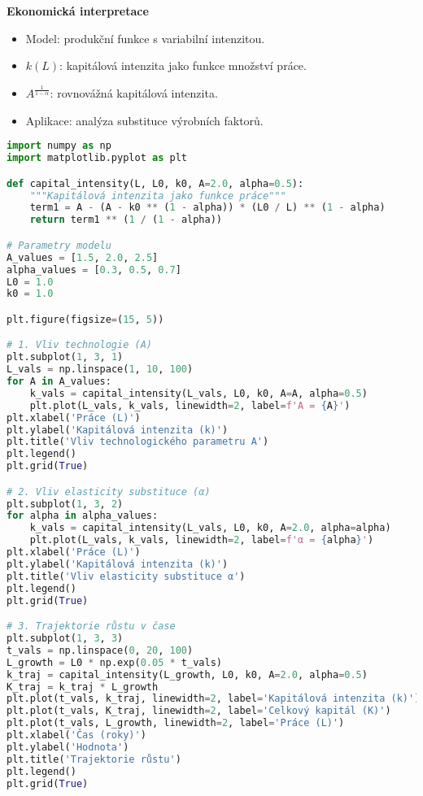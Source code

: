 \begin{example}
\noindent\textbf{Ekonomická interpretace}
\begin{itemize}
\item Model: produkční funkce s variabilní intenzitou.
\item $k(L)$: kapitálová intenzita jako funkce množství práce.
\item $A^{\tfrac{1}{1-\alpha}}$: rovnovážná kapitálová intenzita.
\item Aplikace: analýza substituce výrobních faktorů.
\end{itemize}

\begin{lstlisting}[language=Python, caption={Implementace modelu substituce v~Pythonu}]
import numpy as np
import matplotlib.pyplot as plt

def capital_intensity(L, L0, k0, A=2.0, alpha=0.5):
    """Kapitálová intenzita jako funkce práce"""
    term1 = A - (A - k0 ** (1 - alpha)) * (L0 / L) ** (1 - alpha)
    return term1 ** (1 / (1 - alpha))

# Parametry modelu
A_values = [1.5, 2.0, 2.5]
alpha_values = [0.3, 0.5, 0.7]
L0 = 1.0
k0 = 1.0

plt.figure(figsize=(15, 5))

# 1. Vliv technologie (A)
plt.subplot(1, 3, 1)
L_vals = np.linspace(1, 10, 100)
for A in A_values:
    k_vals = capital_intensity(L_vals, L0, k0, A=A, alpha=0.5)
    plt.plot(L_vals, k_vals, linewidth=2, label=f'A = {A}')
plt.xlabel('Práce (L)')
plt.ylabel('Kapitálová intenzita (k)')
plt.title('Vliv technologického parametru A')
plt.legend()
plt.grid(True)

# 2. Vliv elasticity substituce (α)
plt.subplot(1, 3, 2)
for alpha in alpha_values:
    k_vals = capital_intensity(L_vals, L0, k0, A=2.0, alpha=alpha)
    plt.plot(L_vals, k_vals, linewidth=2, label=f'α = {alpha}')
plt.xlabel('Práce (L)')
plt.ylabel('Kapitálová intenzita (k)')
plt.title('Vliv elasticity substituce α')
plt.legend()
plt.grid(True)

# 3. Trajektorie růstu v čase
plt.subplot(1, 3, 3)
t_vals = np.linspace(0, 20, 100)
L_growth = L0 * np.exp(0.05 * t_vals)
k_traj = capital_intensity(L_growth, L0, k0, A=2.0, alpha=0.5)
K_traj = k_traj * L_growth
plt.plot(t_vals, k_traj, linewidth=2, label='Kapitálová intenzita (k)')
plt.plot(t_vals, K_traj, linewidth=2, label='Celkový kapitál (K)')
plt.plot(t_vals, L_growth, linewidth=2, label='Práce (L)')
plt.xlabel('Čas (roky)')
plt.ylabel('Hodnota')
plt.title('Trajektorie růstu')
plt.legend()
plt.grid(True)


\end{lstlisting}
\end{example}
